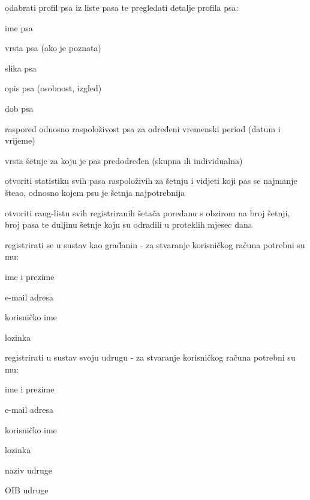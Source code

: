 \begin{packed_enum}
\begin{packed_enum}
				\item odabrati profil psa iz liste pasa te pregledati detalje profila psa: 
				\begin{packed_enum}
					\item ime psa
					\item vrsta psa (ako je poznata)
					\item slika psa
					\item opis psa (osobnost, izgled)
					\item dob psa
					\item raspored odnosno raspoloživost psa za određeni vremenski period (datum i vrijeme) 
					\item vrsta šetnje za koju je pas predodređen (skupna ili individualna)
				\end{packed_enum} 
				\item otvoriti statistiku svih pasa raspoloživih za šetnju i vidjeti koji pas se najmanje šteao, odnosno kojem psu je šetnja najpotrebnija
				\item  otvoriti rang-listu svih registriranih šetača poredanu s obzirom na broj šetnji, broj pasa te duljinu šetnje koju su odradili u proteklih mjesec dana
				\item registrirati se u sustav kao građanin - za stvaranje korisničkog računa potrebni su mu:
				\begin{packed_enum}
					\item ime i prezime
					\item e-mail adresa
					\item korisničko ime
					\item lozinka 
				\end{packed_enum}
				\item registrirati u sustav svoju udrugu - za stvaranje korisničkog računa potrebni su mu:
				\begin{packed_enum}
					\item ime i prezime
					\item e-mail adresa
					\item korisničko ime
					\item lozinka 
					\item naziv udruge
					\item OIB udruge
				\end{packed_enum}
			
				
			\end{packed_enum}
			\vspace{5mm}
			

\end{packed_enum}
